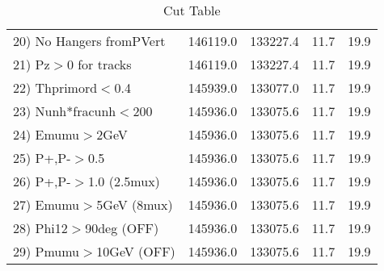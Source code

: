 \begin{table}[h!]
\begin{tabular}{||l||r|r|r|r||}
 20) No Hangers fromPVert &    146119.0 &    133227.4 &        11.7 &        19.9 \\
 21) Pz$>$0 for tracks    &    146119.0 &    133227.4 &        11.7 &        19.9 \\
 22) Thprimord$<$0.4      &    145939.0 &    133077.0 &        11.7 &        19.9 \\
 23) Nunh*fracunh$<$200   &    145936.0 &    133075.6 &        11.7 &        19.9 \\
 24) Emumu$>$2GeV         &    145936.0 &    133075.6 &        11.7 &        19.9 \\
 25) P+,P-$>$0.5          &    145936.0 &    133075.6 &        11.7 &        19.9 \\
 26) P+,P-$>$1.0 (2.5mux) &    145936.0 &    133075.6 &        11.7 &        19.9 \\
 27) Emumu$>$5GeV  (8mux) &    145936.0 &    133075.6 &        11.7 &        19.9 \\
 28) Phi12$>$90deg  (OFF) &    145936.0 &    133075.6 &        11.7 &        19.9 \\
 29) Pmumu$>$10GeV  (OFF) &    145936.0 &    133075.6 &        11.7 &        19.9 \\
 \hline
 \hline
 \end{tabular}
 \caption{Cut Table \cohjp  }
 \label{tab-cut__jpsi}
 \end{table}
